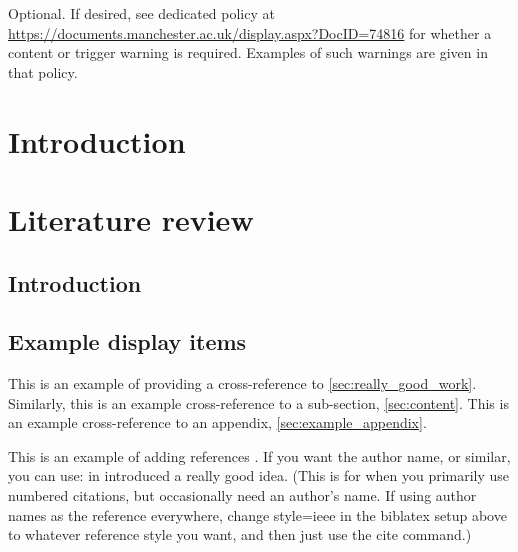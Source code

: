 \documentclass[times,12pt,thesis,online]{uom_thesis_casson} %
\begin{document}
\begin{uomcontent} %
Optional. If desired, see dedicated policy at \url{https://documents.manchester.ac.uk/display.aspx?DocID=74816} for whether a content or trigger warning is required. Examples of such warnings are given in that policy.
\end{uomcontent} 



\uomstartmainbody %



\chapter{Introduction} %
  
  \lipsum[1-5] %



\chapter{Literature review}

  \section{Introduction}
    \lipsum[1] 
  
  \section{Example display items}
    This is an example of providing a cross-reference to \ref{sec:really_good_work}. Similarly, this is an example cross-reference to a sub-section, \ref{sec:content}. This is an example cross-reference to an appendix, \ref{sec:example_appendix}.
    
    This is an example of adding references \cite{ref:jCAS09,ref:jCAS09a,ref:jCAS10}. If you want the author name, or similar, you can use: \citeauthor*{ref:jCAS09} in \citeyear{ref:jCAS09} introduced a really good idea. (This is for when you primarily use numbered citations, but occasionally need an author's name. If using author names as the reference everywhere, change style=ieee in the biblatex setup above to whatever reference style you want, and then just use the cite command.)
\end{document}
